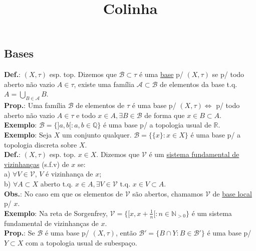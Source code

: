 \documentclass{article}
\title{Colinha}
\begin{document}
\begin{landscape}

\begin{multicols}{3}

\section{Bases}

\textbf{Def.}: $(X, \tau)$ esp. top. Dizemos que $\mathcal{B} \subset \tau$ é uma \underline{base} p/ $(X, \tau)$ se p/ todo aberto não vazio $A \in \tau$, existe uma família $\mathcal{A} \subset \mathcal{B}$ de elementos da base t.q. $A = \bigcup_{B \in \mathcal{A}}B$.\\
\textbf{Prop.}: Uma família $\mathcal{B}$ de elementos de $\tau$ é uma base p/ $(X, \tau) \iff$ p/ todo aberto não vazio $A \in \tau$ e todo $x \in A, \exists B \in \mathcal{B}$ de forma que $x \in B \subset A$.\\
\textbf{Exemplo}: $\mathcal{B} = \{]a,b[: a,b \in \mathbb{Q}\}$ é uma base p/ a topologia usual de $\mathbb{R}$.\\
\textbf{Exemplo}: Seja $X$ um conjunto qualquer. $\mathcal{B} = \{\{x\} : x \in X\}$ é uma base p/ a topologia discreta sobre $X$.\\
\textbf{Def.}: $(X, \tau)$ esp. top. $x \in X$. Dizemos que $\mathcal{V}$ é um \underline{sistema fundamental de vizinhanças} (s.f.v) de $x$ se:\\
a) $\forall V \in \mathcal{V}$, $V$ é vizinhança de $x$;\\
b) $\forall A \subset X$ aberto t.q. $x \in A, \exists V \in \mathcal{V}$ t.q. $x \in V \subset A$.\\
\textbf{Obs.}: No caso em que os elementos de $\mathcal{V}$ são abertos, chamamos $\mathcal{V}$ de \underline{base local} p/ $x$.\\
\textbf{Exemplo}: Na reta de Sorgenfrey, $\mathcal{V} = \{[x,x+\frac{1}{n}[: n \in \mathbb{N}_{>0}\}$ é um sistema fundamental de vizinhanças de $x$.\\
\textbf{Prop.}: Se $\mathcal{B}$ é uma base p/ $(X, \tau)$, então $\mathcal{B}' = \{B \cap Y: B \in \mathcal{B}'\}$ é uma base p/ $Y \subset X$ com a topologia usual de subespaço.
\end{multicols}
\begin{center}


\end{center}
\end{landscape}
\end{document}
